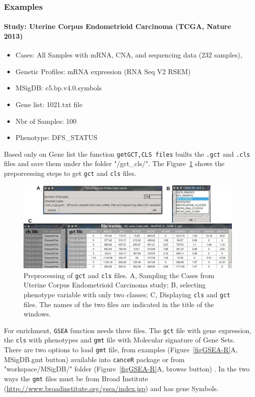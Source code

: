 \documentclass[a4paper]{article}
\begin{document}
\subsubsection{Examples}
\paragraph{Study: Uterine Corpus Endometrioid Carcinoma (TCGA, Nature 2013)}
\begin{itemize}
    \item Cases: All Samples with mRNA, CNA, and sequencing data (232 samples),
    \item Genetic Profiles: mRNA expression (RNA Seq V2 RSEM)
    \item MSigDB: c5.bp.v4.0.symbols
    \item Gene list: 1021.txt file
    \item Nbr of Samples: 100
    \item Phenotype: DFS\_STATUS
 \end{itemize}
 
Based only on Gene list the function \texttt{getGCT,CLS files} builts the \texttt{.gct} and \texttt{.cls} files and save them under the folder "/gct\_cls/". The Figure~\ref{figgctcls} shows the preporcessing steps to get \texttt{gct} and \texttt{cls} files.
 

 \begin{figure}[!ht]
  \centering
 \includegraphics[scale=2]{image/gct_cls.png}
 \caption{Preprocessing of \texttt{gct} and \texttt{cls} files. A, Sampling the Cases from Uterine Corpus Endometrioid Carcinoma study; B, selecting phenotype variable with only two classes; C, Displaying \texttt{cls} and \texttt{gct} files. The names of the two files are indicated in the title of the windows.}
 \label{figgctcls}
 \end{figure}

For enrichment, \texttt{GSEA} function needs three files. The \texttt{gct} file with gene expression, the \texttt{cls} with phenotypes and \texttt{gmt} file with Molecular signature of Gene Sets. There are two options to load \texttt{gmt} file, from examples (Figure~\ref{figGSEA-R}A, MSigDB.gmt button) available into  \texttt{canceR} package or from "workspace/MSigDB/" folder (Figure~\ref{figGSEA-R}A, browse button) . In the two ways the \texttt{gmt} files must be from Broad Institute (\url{http://www.broadinstitute.org/gsea/index.jsp}) and has gene Symbols. 
\end{document}
